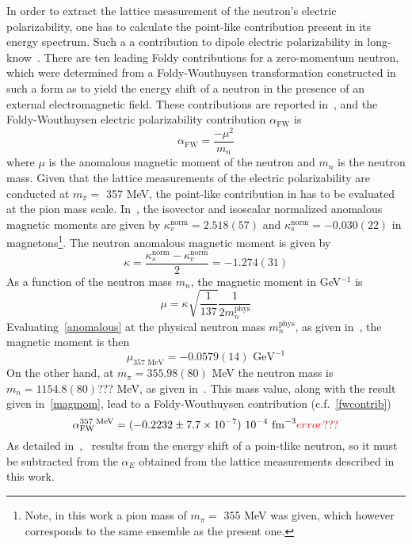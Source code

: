 In order to extract the lattice measurement of the neutron's electric polarizability,
one has to calculate the point-like contribution present in its energy spectrum. Such a 
a contribution to dipole electric polarizability in long-know~\cite{Foldy:1959zza}. There are ten
leading Foldy contributions for a zero-momentum neutron, which were determined
from a Foldy-Wouthuysen transformation constructed in such a form as to yield
the energy shift of a neutron in the presence of an external electromagnetic field.
These contributions are reported in~\cite{Saenz:2020yxy}, and the Foldy-Wouthuysen
electric polarizability contribution $\alpha_{\text{FW}}$ is
\begin{equation}
\alpha_{\text{FW}}=\frac{-\mu^2}{m_n}
\label{fwcontrib}
\end{equation}
where $\mu$ is the anomalous magnetic moment of the neutron and $m_n$ is the 
neutron mass. Given that the lattice measurements of the electric polarizability are
conducted at $m_\pi=$ 357 MeV, the point-like contribution in  has to be
evaluated at the pion mass scale. In~\cite{Green:2019zhh}, the isovector and
isoscalar normalized anomalous magnetic moments are given by 
$\kappa_v^{\text{norm}}=2.518(57)$ and $\kappa_s^{\text{norm}}=-0.030(22)$
in magnetons\footnote{Note, in this work a pion mass of $m_\pi=$ 355 MeV was given, which however corresponds to the same ensemble as the present one.}. 
The neutron anomalous magnetic moment is given by
\begin{equation}
\kappa=\frac{\kappa_s^{\text{norm}}-\kappa_v^{\text{norm}}}{2}=-1.274(31)
\end{equation}
As a function of the neutron mass $m_n$, the magnetic moment in GeV$^{-1}$ is
\begin{equation}
\mu=\kappa\sqrt{\frac{1}{137}}\frac{1}{2m_n^{\text{phys}}}
\label{anomalous}
\end{equation}
Evaluating~\ref{anomalous} at the physical neutron mass $m_n^{\text{phys}}$, as given 
in~\cite{ParticleDataGroup:2016lqr}, the magnetic moment is then
\begin{equation}
\mu_{357\text{ MeV}}=-0.0579(14)\text{ GeV}^{-1}
\label{magmom}
\end{equation}
On the other hand, at $m_\pi=355.98(80)$ MeV the {\cred neutron mass is $m_n=1154.8(80)$???} 
MeV, as given in~\cite{LHPC:2010jcs}. This mass value, along with the result given in~\ref{magmom}, lead to 
a Foldy-Wouthuysen contribution (c.f.~\ref{fwcontrib})
\begin{equation}
\alpha_{\text{FW}}^{357\text{ MeV}}=(-0.2232\pm7.7\times 10^{-7})\text{ }10^{-4}\text{ fm}^{-3} {\color{red} error???}
\end{equation}
As detailed in~\cite{Saenz:2020yxy},~ results from the energy shift of a 
poin-tlike neutron, so it must be subtracted from the $\alpha_E$ obtained from the lattice 
measurements described in this work.
